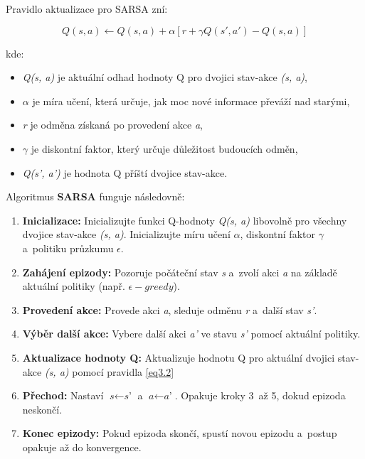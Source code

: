 Pravidlo aktualizace pro SARSA zní:

\begin{equation}
Q(s, a) \leftarrow Q(s, a) + \alpha \left[ r + \gamma Q(s', a') - Q(s, a) \right]
\label{eq3.2}
\end{equation}

kde:
\begin{itemize}
	\item \textit{Q(s, a)} je aktuální odhad hodnoty Q pro dvojici stav-akce \textit{(s, a)},
	\item \textit{$\alpha$} je míra učení, která určuje, jak moc nové informace převáží nad starými,
	\item \textit{r} je odměna získaná po provedení akce \textit{a},
	\item \textit{$\gamma$} je diskontní faktor, který určuje důležitost budoucích odměn,
	\item \textit{Q(s', a')} je hodnota Q příští dvojice stav-akce.
\end{itemize}

Algoritmus \textbf{SARSA} funguje následovně:
\begin{enumerate}
    \item \textbf{Inicializace:} Inicializujte funkci Q-hodnoty \textit{Q(s, a)} libovolně pro všechny dvojice stav-akce \textit{(s, a)}. Inicializujte míru učení \textit{$\alpha$}, diskontní faktor \textit{$\gamma$} a~politiku průzkumu \textit{$\epsilon$}.
    
    \item \textbf{Zahájení epizody:} Pozoruje počáteční stav \textit{s} a~zvolí akci \textit{a} na základě aktuální politiky (např. \textit{$\epsilon-greedy$}).
    
    \item \textbf{Provedení akce:} Provede akci \textit{a}, sleduje odměnu \textit{r} a~další stav \textit{s'}.
    
    \item \textbf{Výběr další akce:} Vybere další akci \textit{a'} ve stavu \textit{s'} pomocí aktuální politiky.
    
    \item \textbf{Aktualizace hodnoty Q:} Aktualizuje hodnotu Q pro aktuální dvojici stav-akce \textit{(s, a)} pomocí pravidla \ref{eq3.2}
 
    
\item \textbf{Přechod:} Nastaví $\textit{s} \leftarrow \textit{s'}$ a $\textit{a} \leftarrow \textit{a'}$. Opakuje kroky 3~až 5, dokud epizoda neskončí.
    
    \item \textbf{Konec epizody:} Pokud epizoda skončí, spustí novou epizodu a~postup opakuje až do konvergence.
\end{enumerate}

